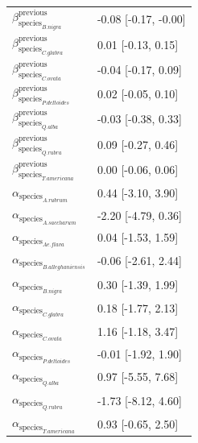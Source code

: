 \begin{table}[ht]
\begin{tabular}{ll}
  $\beta_{\text{species}_{B. nigra}}^{\text{previous}}$ & -0.08 [-0.17, -0.00] \\ 
  $\beta_{\text{species}_{C. glabra}}^{\text{previous}}$ & 0.01 [-0.13, 0.15] \\ 
  $\beta_{\text{species}_{C. ovata}}^{\text{previous}}$ & -0.04 [-0.17, 0.09] \\ 
  $\beta_{\text{species}_{P. deltoides}}^{\text{previous}}$ & 0.02 [-0.05, 0.10] \\ 
  $\beta_{\text{species}_{Q. alba}}^{\text{previous}}$ & -0.03 [-0.38, 0.33] \\ 
  $\beta_{\text{species}_{Q. rubra}}^{\text{previous}}$ & 0.09 [-0.27, 0.46] \\ 
  $\beta_{\text{species}_{T. americana}}^{\text{previous}}$ & 0.00 [-0.06, 0.06] \\ 
  $\alpha_{\text{species}_{A. rubrum}}$ & 0.44 [-3.10, 3.90] \\ 
  $\alpha_{\text{species}_{A. saccharum}}$ & -2.20 [-4.79, 0.36] \\ 
  $\alpha_{\text{species}_{Ae. flava}}$ & 0.04 [-1.53, 1.59] \\ 
  $\alpha_{\text{species}_{B. alleghaniensis}}$ & -0.06 [-2.61, 2.44] \\ 
  $\alpha_{\text{species}_{B. nigra}}$ & 0.30 [-1.39, 1.99] \\ 
  $\alpha_{\text{species}_{C. glabra}}$ & 0.18 [-1.77, 2.13] \\ 
  $\alpha_{\text{species}_{C. ovata}}$ & 1.16 [-1.18, 3.47] \\ 
  $\alpha_{\text{species}_{P. deltoides}}$ & -0.01 [-1.92, 1.90] \\ 
  $\alpha_{\text{species}_{Q. alba}}$ & 0.97 [-5.55, 7.68] \\ 
  $\alpha_{\text{species}_{Q. rubra}}$ & -1.73 [-8.12, 4.60] \\ 
  $\alpha_{\text{species}_{T. americana}}$ & 0.93 [-0.65, 2.50] \\ 
   \hline
\end{tabular}
\end{table}


